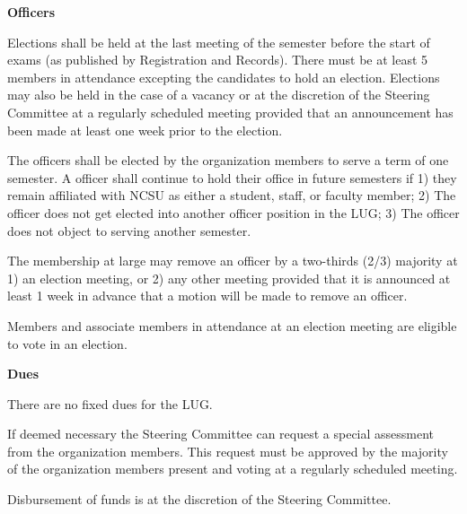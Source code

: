 \begin{art} {\bf Officers}
\begin{sect}
Elections shall be held at the last meeting of the semester before the
start of exams (as published by Registration and Records).  There must be
at least 5 members in attendance excepting the candidates to hold an election.
Elections may also be held in the case of a vacancy or at the discretion of the
Steering Committee at a regularly scheduled meeting provided that an
announcement has been made at least one week prior to the election.
\end{sect}
\begin{sect}
The officers shall be elected by the organization members to serve a term of one
semester.  A officer shall continue to hold their office in future semesters
if 1) they remain affiliated with NCSU as either a student, staff, or faculty
member; 2) The officer does not get elected
into another officer position in the LUG; 3) The officer does not object
to serving another semester.
\end{sect}
\begin{sect}
The membership at large may remove an officer by a two-thirds (2/3) majority at 1) an election meeting, or 2) any other meeting provided that it is announced at least 1 week in advance that a motion will be made to remove an officer.
\end{sect}
\begin{sect}
Members and associate members in attendance at an election meeting are eligible to vote in an election.
\end{sect}

\end{art}

\bigskip
\begin{art} {\bf Dues}
\label{art-dues}

\begin{sect}
There are no fixed dues for the LUG.
\end{sect}

\begin{sect}
If deemed necessary the Steering Committee can request a special assessment
from the organization members.  This request must be approved by the majority of
the organization members present and voting at a regularly scheduled meeting.
\end{sect}

\begin{sect}
Disbursement of funds is at the discretion of the Steering Committee.
\end{sect}

\end{art}

